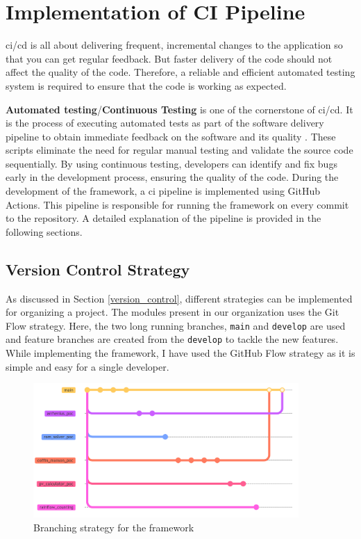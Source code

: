 \chapter{Implementation of CI Pipeline} \label{ci_pipeline}
\acrshort{ci}/\acrshort{cd} is all about delivering frequent, incremental changes to the application so that you can get regular feedback. But faster delivery
of the code should not affect the quality of the code. Therefore, a reliable and efficient automated testing system is required to ensure that the code is 
working as expected.

\textbf{Automated testing}/\textbf{Continuous Testing} is one of the cornerstone of \acrshort{ci}/\acrshort{cd}. It is the process of executing automated tests as part of the 
software delivery pipeline to obtain immediate feedback on the software and its quality \cite{10434454}. These scripts eliminate the need for regular manual
testing and validate the source code sequentially. By using continuous testing, developers can identify and fix bugs early in the development process, ensuring
the quality of the code. During the development of the framework, a \acrshort{ci} pipeline is implemented using GitHub Actions. This pipeline is responsible 
for running the framework on every commit to the repository. A detailed explanation of the pipeline is provided in the following sections.

\section{Version Control Strategy}
As discussed in Section \ref{version_control}, different strategies can be implemented for organizing a project. The modules present in our organization uses the 
Git Flow strategy. Here, the two long running branches, \texttt{main} and \texttt{develop} are used and feature branches are created from the \texttt{develop}
to tackle the new features. While implementing the framework, I have used the GitHub Flow strategy as it is simple and easy for a single developer. 
\newpage
\begin{figure}[!ht]
    \centering
    \includegraphics[width=0.9\textwidth]{Images/thesis_branching_strategy.png}
    \caption{Branching strategy for the framework}
    \label{branching_strategy}
\end{figure}


